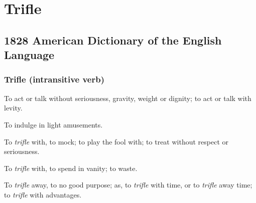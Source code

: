 \section{Trifle}
	\label{TRIFLE}
	

\subsection{1828 American Dictionary of the English Language} %
	\label{TRIFLE-1828}
	
	\subsubsection{Trifle (intransitive verb)}

	\begin{compactitem}
		\item[] To act or talk without seriousness, gravity, weight or dignity; to act or talk with levity.
		\item[1] To indulge in light amusements.
		\item[] To \textit{trifle} with, to mock; to play the fool with; to treat without respect or seriousness.
		\item[] To \textit{trifle} with, to spend in vanity; to waste.
		\item[] To \textit{trifle} away, to no good purpose; as, to \textit{trifle} with time, or to \textit{trifle} away time; to \textit{trifle} with advantages.
	\end{compactitem}



